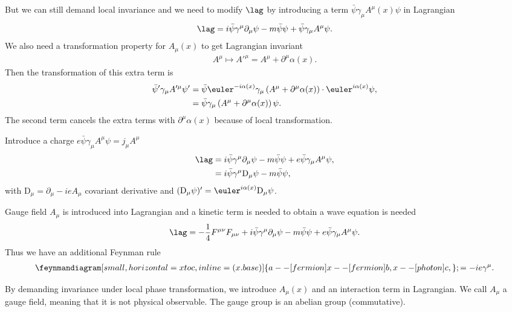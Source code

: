 But we can still demand local invariance and we need to modify $\lag$ by introducing a term $\bar{\psi} \gamma_\mu A^\mu(x) \psi$ in Lagrangian
\begin{align}
   \lag = i \bar\psi \gamma^\mu \partial_\mu \psi - m \bar\psi \psi + \bar\psi \gamma_\mu A^\mu \psi.
\end{align}
We also need a transformation property for $A_\mu(x)$ to get Lagrangian invariant
\begin{align}
   A^\mu \mapsto A'^\mu = A^\mu + \partial^\mu \alpha(x).
\end{align}
Then the transformation of this extra term is
\begin{align*}
   \bar\psi' \gamma_\mu A'^\mu \psi' &=  \bar{\psi} \euler^{-i\alpha(x)} \gamma_\mu \left( A^\mu + \partial^\mu \alpha(x) \right) \cdot \euler^{i\alpha(x)}\psi,  \\
                     &= \bar{\psi} \gamma_\mu \left( A^\mu + \partial^\mu \alpha(x) \right) \psi.
\end{align*}
The second term cancels the extra terms with $\partial^\mu \alpha(x)$ because of local transformation.

Introduce a charge $e \bar\psi \gamma_\mu A^\mu \psi = j_\mu A^\mu$
\begin{align}
   \lag &= i \bar\psi \gamma^\mu \partial_\mu \psi - m \bar\psi \psi + e \bar\psi \gamma_\mu A^\mu \psi, \notag \\
        &= i \bar\psi \gamma^\mu \text{D}_\mu \psi - m \bar\psi \psi,
\end{align}
with $\text{D}_\mu = \partial_\mu -ieA_\mu$ covariant derivative and $(\text{D}_\mu \psi)' = \euler^{i\alpha(x)} \text{D}_\mu \psi$.

Gauge field $A_\mu$ is introduced into Lagrangian and a kinetic term is needed to obtain a wave equation is needed
\begin{align}
   \lag &= -\frac{1}{4}F^{\mu\nu}F_{\mu\nu} +  i \bar\psi \gamma^\mu \partial_\mu \psi - m \bar\psi \psi + e \bar\psi \gamma_\mu A^\mu \psi. \notag \\
\end{align}
Thus we have an additional Feynman rule
\begin{align}
   \feynmandiagram[small, horizontal=x to c, inline=(x.base)]{ a --[fermion]x --[fermion]b, x --[photon] c,}; = -ie\gamma^\mu.
\end{align}

By demanding invariance under local phase transformation, we introduce $A_\mu(x)$ and an interaction term in Lagrangian. We call $A_\mu$ a gauge field, meaning that it is not physical observable. The gauge group is an abelian group (commutative).

